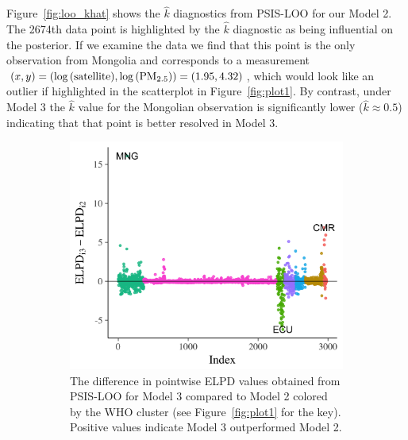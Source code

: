 \documentclass{statsoc}
\begin{document}
Figure~\ref{fig:loo_khat} shows the $\hat{k}$ diagnostics from PSIS-LOO for our
Model 2. The 2674th data point is highlighted by the $\hat{k}$ diagnostic as
being influential on the posterior. If we examine the data we find that this
point is the only observation from Mongolia and corresponds to a measurement
$(x,y) = (\log{(\rm satellite)}, \log{({\rm PM}_{2.5})}) = (1.95, 4.32)$,
which would look like an outlier if highlighted in the scatterplot in
Figure~\ref{fig:plot1}. By contrast, under Model 3 the $\hat{k}$ value for the
Mongolian observation is significantly lower ($\hat{k} \approx 0.5$) indicating
that that point is better resolved in Model 3.

\begin{figure}
\centering
\begin{subfigure}{0.48\textwidth}
\includegraphics[width=\textwidth]{loo_elpd_diff_23.png}
\caption{The difference in pointwise ELPD values obtained from PSIS-LOO for
Model 3 compared to Model 2 colored by the WHO cluster (see
Figure~\ref{fig:plot1} for the key). Positive values indicate Model 3
outperformed Model 2.}
\label{fig:loo_elpd_diff}
\end{subfigure}
~
\begin{subfigure}{0.48\textwidth}

\end{subfigure}
\end{figure}
\end{document}
